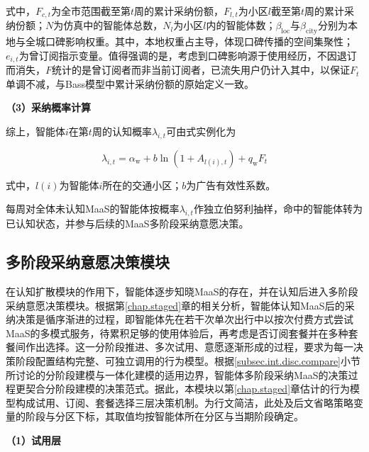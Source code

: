 \noindent 式中，$F_{c,t}$为全市范围截至第$t$周的累计采纳份额，$F_{l,t}$为小区$l$截至第$t$周的累计采纳份额；$N$为仿真中的智能体总数，$N_l$为小区$l$内的智能体数；$\beta_{\mathrm{loc}}$与$\beta_{\mathrm{city}}$分别为本地与全城口碑影响权重。其中，本地权重占主导，体现口碑传播的空间集聚性；$e_{i,t}$为曾订阅指示变量。值得强调的是，考虑到口碑影响源于使用经历，不因退订而消失，$F$统计的是曾订阅者而非当前订阅者，已流失用户仍计入其中，以保证$F_{t}$单调不减，与Bass模型中累计采纳份额的原始定义一致。

\textbf{（3）采纳概率计算}

综上，智能体$i$在第$t$周的认知概率$\lambda_{i,t}$可由式实例化为

\begin{equation}
\lambda_{i,t} = \alpha_{\mathrm{w}} + b\ln \left(1+A_{l(i),t}\right) + q_{\mathrm{w}}F_{t}
\label{eq.opt.hazard}
\end{equation}

\noindent 式中，$l(i)$为智能体$i$所在的交通小区；$b$为广告有效性系数。

每周对全体未认知MaaS的智能体按概率$\lambda_{i,t}$作独立伯努利抽样，命中的智能体转为已认知状态，并参与后续的MaaS多阶段采纳意愿决策。

\subsection{多阶段采纳意愿决策模块}\label{subsec.opt.abm.decision}

在认知扩散模块的作用下，智能体逐步知晓MaaS的存在，并在认知后进入多阶段采纳意愿决策模块。根据第\ref{chap.staged}章的相关分析，智能体认知MaaS后的采纳决策是循序渐进的过程，即智能体先在若干次单次出行中以按次付费方式尝试MaaS的多模式服务，待累积足够的使用体验后，再考虑是否订阅套餐并在多种套餐间作出选择。这一分阶段推进、多次试用、意愿逐渐形成的过程，要求为每一决策阶段配置结构完整、可独立调用的行为模型。根据\ref{subsec.int.disc.compare}小节所讨论的分阶段建模与一体化建模的适用边界，智能体多阶段采纳MaaS的决策过程更契合分阶段建模的决策范式。据此，本模块以第\ref{chap.staged}章估计的行为模型构成试用、订阅、套餐选择三层决策机制。为行文简洁，此处及后文省略策略变量的阶段与分区下标，其取值均按智能体所在分区与当期阶段确定。

\textbf{（1）试用层}

